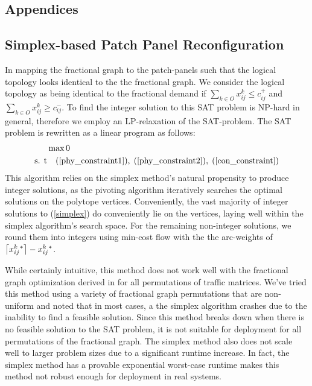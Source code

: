\documentclass[sigconf]{acmart}
\theoremstyle{definition}
\begin{document}

\clearpage

\clearpage
\clearpage
\begin{appendices}

\section{Appendices}
\subsection{Simplex-based Patch Panel Reconfiguration}
In mapping the fractional graph to the patch-panels such that the logical topology looks identical to the the fractional graph. We consider the logical topology as being identical to the fractional demand if $\sum_{k \in O}x_{ij}^k \leq c_{ij}^+$ and $\sum_{k \in O}x_{ij}^k \geq c_{ij}^-$. To find the integer solution to this SAT problem is NP-hard in general, therefore we employ an LP-relaxation of the SAT-problem. The SAT problem is rewritten as a linear program as follows:
\begin{equation}\label{simplex}
\begin{aligned}
    & \max 0\\
     \text{s. t} & \quad (\ref{phy_constraint1}), \; (\ref{phy_constraint2}), \; (\ref{con_constraint})\\
\end{aligned}
\end{equation}
This algorithm relies on the simplex method's natural propensity to produce integer solutions, as the pivoting algorithm iteratively searches the optimal solutions on the polytope vertices. Conveniently, the vast majority of integer solutions to (\ref{simplex}) do conveniently lie on the vertices, laying well within the simplex algorithm's search space. For the remaining non-integer solutions, we round them into integers using min-cost flow with the the arc-weights of $\left\lceil x_{ij}^k {}^* \right\rceil - x_{ij}^k{}^*$.

While certainly intuitive, this method does not work well with the fractional graph optimization derived in for all permutations of traffic matrices. We've tried this method using a variety of fractional graph permutations that are non-uniform and noted that in most cases, a the simplex algorithm crashes due to the inability to find a feasible solution. Since this method breaks down when there is no feasible solution to the SAT problem, it is not suitable for deployment for all permutations of the fractional graph. The simplex method also does not scale well to larger problem sizes due to a significant runtime increase. In fact, the simplex method has a provable exponential worst-case runtime makes this method not robust enough for deployment in real systems.



\end{appendices}
\end{document}
